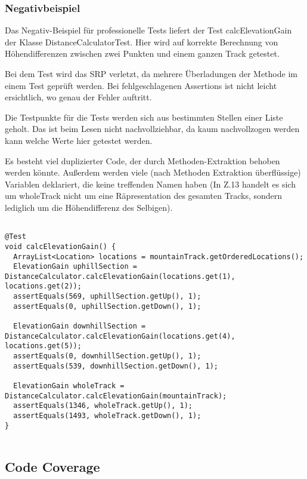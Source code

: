 \subsubsection{Negativbeispiel}

Das Negativ-Beispiel für professionelle Tests liefert der Test calcElevationGain der Klasse DistanceCalculatorTest. Hier wird auf korrekte Berechnung von Höhendifferenzen zwischen zwei Punkten und einem ganzen Track getestet.

Bei dem Test wird das SRP verletzt, da mehrere Überladungen der Methode im einem Test geprüft werden. Bei fehlgeschlagenen Assertions ist nicht leicht ersichtlich, wo genau der Fehler auftritt.

Die Testpunkte für die Tests werden sich aus bestimmten Stellen einer Liste geholt. Das ist beim Lesen nicht nachvollziehbar, da kaum nachvollzogen werden kann welche Werte hier getestet werden.

Es besteht viel duplizierter Code, der durch Methoden-Extraktion behoben werden könnte. Außerdem werden viele (nach Methoden Extraktion überflüssige) Variablen deklariert, die keine treffenden Namen haben (In Z.13 handelt es sich um wholeTrack nicht um eine Räpresentation des gesamten Tracks, sondern lediglich um die Höhendifferenz des Selbigen).

\begin{lstlisting}
  
@Test
void calcElevationGain() {
  ArrayList<Location> locations = mountainTrack.getOrderedLocations();
  ElevationGain uphillSection = DistanceCalculator.calcElevationGain(locations.get(1), locations.get(2));
  assertEquals(569, uphillSection.getUp(), 1);
  assertEquals(0, uphillSection.getDown(), 1);

  ElevationGain downhillSection = DistanceCalculator.calcElevationGain(locations.get(4), locations.get(5)); 
  assertEquals(0, downhillSection.getUp(), 1);
  assertEquals(539, downhillSection.getDown(), 1);

  ElevationGain wholeTrack = DistanceCalculator.calcElevationGain(mountainTrack);
  assertEquals(1346, wholeTrack.getUp(), 1);
  assertEquals(1493, wholeTrack.getDown(), 1);
}
    
\end{lstlisting}

\subsection{Code Coverage}

